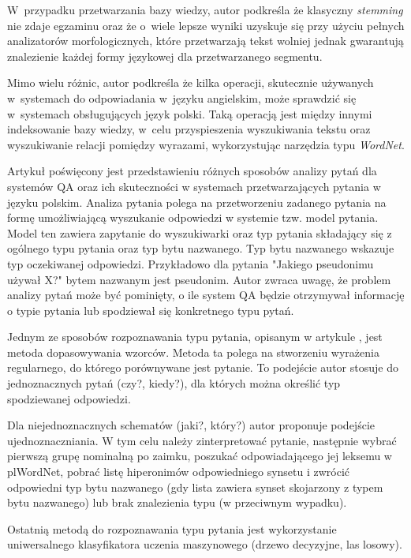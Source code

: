 W~przypadku przetwarzania bazy wiedzy, autor podkreśla że klasyczny \emph{stemming} nie zdaje egzaminu oraz że o~wiele lepsze wyniki uzyskuje się przy użyciu pełnych analizatorów morfologicznych, które przetwarzają tekst wolniej jednak gwarantują znalezienie każdej formy językowej dla przetwarzanego segmentu.

Mimo wielu różnic, autor podkreśla że kilka operacji, skutecznie używanych w~systemach do odpowiadania w~języku angielskim, może sprawdzić się w~systemach obsługujących język polski. Taką operacją jest między innymi indeksowanie bazy wiedzy, w~celu przyspieszenia wyszukiwania tekstu oraz wyszukiwanie relacji pomiędzy wyrazami, wykorzystując narzędzia typu \emph{WordNet}\cite{przybyla2012issues}.

Artykuł \cite{przybyla-2013-question} poświęcony jest przedstawieniu różnych sposobów analizy pytań dla systemów QA oraz ich skuteczności w systemach przetwarzających pytania w języku polskim. Analiza pytania polega na przetworzeniu zadanego pytania na formę umożliwiającą wyszukanie odpowiedzi w systemie tzw. model pytania. Model ten zawiera zapytanie do wyszukiwarki oraz typ pytania składający się z ogólnego typu pytania oraz typ bytu nazwanego. Typ bytu nazwanego wskazuje typ oczekiwanej odpowiedzi. Przykładowo dla pytania "Jakiego pseudonimu używał X?" bytem nazwanym jest pseudonim. Autor zwraca uwagę, że problem analizy pytań może być pominięty, o ile system QA będzie otrzymywał informację o typie pytania lub spodziewał się konkretnego typu pytań.

Jednym ze sposobów rozpoznawania typu pytania, opisanym w artykule \cite{przybyla-2013-question}, jest metoda dopasowywania wzorców. Metoda ta polega na stworzeniu wyrażenia regularnego, do którego porównywane jest pytanie. To podejście autor stosuje do jednoznacznych pytań (czy?, kiedy?), dla których można określić typ spodziewanej odpowiedzi. 

Dla niejednoznacznych schematów (jaki?, który?) autor proponuje podejście ujednoznaczniania. W tym celu należy zinterpretować pytanie, następnie wybrać pierwszą grupę nominalną po zaimku, poszukać odpowiadającego jej leksemu w plWordNet, pobrać listę hiperonimów odpowiedniego synsetu i zwrócić odpowiedni typ bytu nazwanego (gdy lista zawiera synset skojarzony z typem bytu nazwanego) lub brak znalezienia typu (w przeciwnym wypadku).

Ostatnią metodą do rozpoznawania typu pytania jest wykorzystanie uniwersalnego klasyfikatora uczenia maszynowego (drzewo decyzyjne, las losowy).

